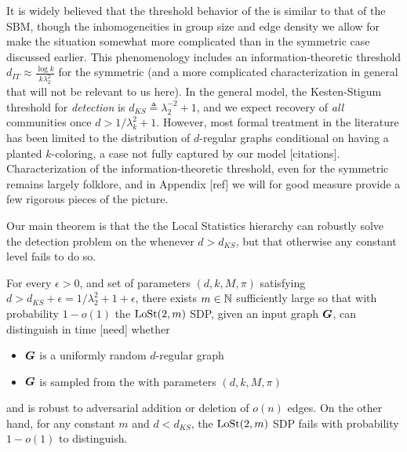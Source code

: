 It is widely believed that the threshold behavior of the \model is similar to that of the SBM, though the inhomogeneities in group size and edge density we allow for make the situation somewhat more complicated than in the symmetric case discussed earlier. This phenomenology includes an information-theoretic threshold $d_{IT} \approx \frac{\log k}{k\lambda_2^2}$ for the symmetric \model (and a more complicated characterization in general that will not be relevant to us here). In the general model, the Kesten-Stigum threshold for \emph{detection} is $d_{KS} \triangleq \lambda_2^{-2} + 1$, and we expect recovery of \emph{all} communities once $d> 1/\lambda_k^2 + 1$. However, most formal treatment in the literature has been limited to the distribution of $d$-regular graphs conditional on having a planted $k$-coloring, a case not fully captured by our model [citations]. Characterization of the information-theoretic threshold, even for the symmetric \model remains largely folklore, and in Appendix [ref] we will for good measure provide a few rigorous pieces of the picture. 

Our main theorem is that the the Local Statistics hierarchy can robustly solve the detection problem on the \model whenever $d > d_{KS}$, but that otherwise any constant level fails to do so.

\begin{theorem} \label{thm:main}
	For every $\epsilon > 0$, and set of parameters $(d,k,M,\pi)$ satisfying $d > d_{KS} + \epsilon = 1/\lambda_2^2 + 1 + \epsilon$, there exists $m \in \mathbb{N}$ sufficiently large so that with probability $1-o(1)$ the $\operatorname{LoSt}(2,m)$ SDP, given an input graph $\boldsymbol{G}$, can distinguish in time [need] whether
	\begin{itemize}
		\item $\boldsymbol{G}$ is a uniformly random $d$-regular graph
		\item $\boldsymbol{G}$ is sampled from the \model with parameters $(d,k,M,\pi)$
	\end{itemize}
	and is robust to adversarial addition or deletion of $o(n)$ edges. On the other hand, for any constant $m$ and $d< d_{KS}$, the $\operatorname{LoSt}(2,m)$ SDP fails with probability $1 - o(1)$ to distinguish.
\end{theorem}



